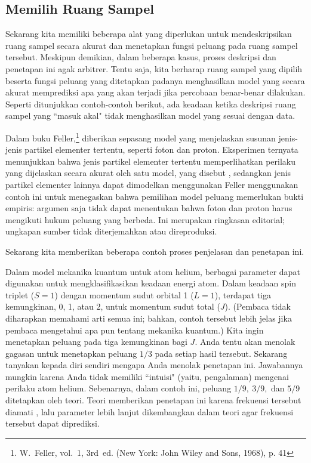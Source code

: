 \subsection*{Memilih Ruang Sampel}

Sekarang kita memiliki beberapa alat yang diperlukan untuk mendeskripsikan ruang sampel
secara akurat dan menetapkan fungsi peluang pada ruang sampel tersebut.  Meskipun
demikian, dalam beberapa kasus, proses deskripsi dan penetapan ini agak arbitrer.
Tentu saja, kita berharap ruang sampel yang dipilih beserta fungsi peluang yang ditetapkan
padanya menghasilkan model yang secara akurat memprediksi apa yang akan terjadi jika
percobaan benar-benar dilakukan.  Seperti ditunjukkan contoh-contoh berikut, ada keadaan
ketika deskripsi ruang sampel yang ``masuk akal" tidak menghasilkan model yang sesuai dengan
data.

Dalam buku Feller,\footnote{W.~Feller,  vol.~1, 3rd~ed. (New York: John Wiley and Sons, 1968), p. 41}
diberikan sepasang model yang menjelaskan susunan jenis-jenis partikel elementer tertentu,
seperti foton dan proton.  Eksperimen ternyata menunjukkan
bahwa jenis partikel elementer tertentu memperlihatkan perilaku yang dijelaskan secara
akurat oleh satu model, yang disebut 
, sedangkan jenis partikel elementer lainnya dapat
dimodelkan menggunakan 
Feller menggunakan contoh ini untuk menegaskan bahwa pemilihan model
peluang memerlukan bukti empiris: argumen  saja tidak dapat menentukan bahwa
foton dan proton harus mengikuti hukum peluang yang berbeda. Ini merupakan ringkasan editorial;
ungkapan sumber tidak diterjemahkan atau direproduksi.

Sekarang kita memberikan beberapa contoh proses penjelasan dan penetapan ini.

\begin{example}\label{exam 3.14}
 Dalam model mekanika kuantum untuk atom helium,
berbagai parameter dapat digunakan untuk mengklasifikasikan keadaan energi atom.  Dalam
keadaan spin triplet ($S =
1$) dengan momentum sudut orbital 1 ($L = 1$), terdapat tiga kemungkinan, 0, 1, atau 2,
untuk momentum sudut total ($J$).  (Pembaca tidak diharapkan memahami arti semua ini;
bahkan, contoh tersebut lebih jelas jika pembaca  mengetahui apa pun tentang
mekanika kuantum.)  Kita ingin menetapkan peluang pada tiga kemungkinan bagi $J$.
Anda tentu akan menolak gagasan untuk menetapkan peluang $1/3$ pada setiap hasil
tersebut.  Sekarang tanyakan kepada diri sendiri mengapa Anda menolak penetapan ini.
Jawabannya mungkin karena Anda tidak memiliki ``intuisi" (yaitu,
pengalaman) mengenai perilaku atom helium.  Sebenarnya, dalam contoh ini, peluang
$1/9,\ 3/9,$ dan $5/9$ ditetapkan oleh teori.  Teori memberikan penetapan ini karena
frekuensi tersebut diamati , lalu parameter lebih lanjut
dikembangkan dalam teori agar frekuensi tersebut dapat diprediksi.
\end{example}

